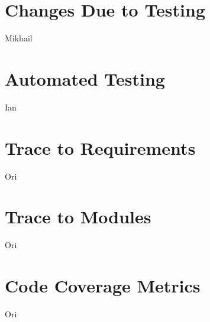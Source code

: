 \documentclass[12pt, titlepage]{article}
\begin{document}
\section{Changes Due to Testing}
	Mikhail

\section{Automated Testing}
	Ian
		
\section{Trace to Requirements}
	Ori

\section{Trace to Modules}		
	Ori

\section{Code Coverage Metrics}
	Ori




\end{document}
